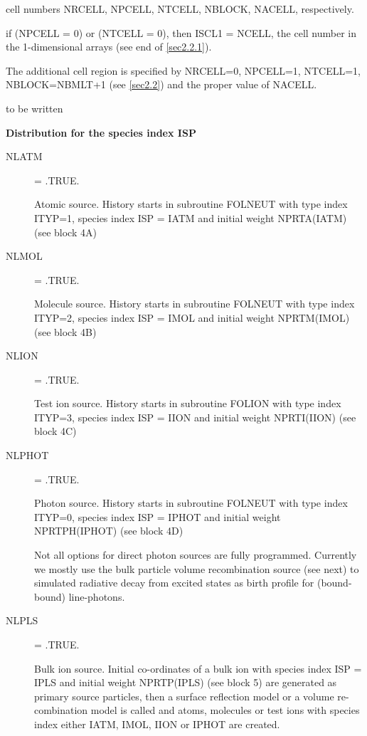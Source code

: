 \begin{description}
\begin{description}
                cell numbers NRCELL, NPCELL, NTCELL, NBLOCK, NACELL, respectively.

                if (NPCELL = 0) or (NTCELL = 0), then ISCL1 = NCELL, the cell
                number in the
                1-dimensional arrays (see end of \cref{sec2.2.1}).

                The additional cell region is specified by NRCELL=0, NPCELL=1, NTCELL=1,
                NBLOCK=NBMLT+1 (see \cref{sec2.2}) and the proper value of NACELL.
          \item[IVLSF=2] to be written
        \end{description}
\end{description}

\medskip 

\textbf{Distribution for the species index ISP} 

\medskip 

\begin{description}
  \item[NLATM] = .TRUE.

        Atomic source.
        History starts in subroutine FOLNEUT with type index ITYP=1, species index ISP
        = IATM and initial weight NPRTA(IATM) (see block 4A)
  \item[NLMOL] = .TRUE.

        Molecule source.
        History starts in subroutine FOLNEUT with type index ITYP=2, species index ISP
        = IMOL and initial weight NPRTM(IMOL) (see block 4B)
  \item[NLION] = .TRUE.

        Test ion source.
        History starts in subroutine FOLION with type index ITYP=3, species index ISP =
        IION and initial weight NPRTI(IION) (see block 4C)
  \item[NLPHOT] = .TRUE.

        Photon source.
        History starts in subroutine FOLNEUT with type index ITYP=0, species index ISP
        = IPHOT and initial weight NPRTPH(IPHOT) (see block 4D) 

        Not all options for direct photon sources are fully programmed.
        Currently we mostly use the bulk particle volume recombination source (see
        next) to simulated radiative decay from excited states as birth profile for
        (bound-bound) line-photons.

  \item[NLPLS] = .TRUE.

        Bulk ion source.
        Initial co-ordinates of a bulk ion with species index ISP = IPLS and initial
        weight NPRTP(IPLS) (see block 5) are generated as primary source particles,
        then a surface reflection model or a volume re-combination model is called and
        atoms, molecules or test ions with species index either IATM, IMOL, IION or
        IPHOT are created.
\end{description}

